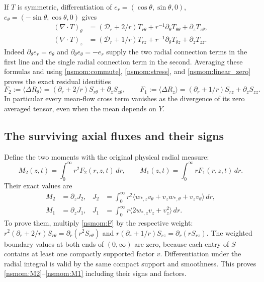If $T$ is symmetric, differentiation of
$e_r=(\cos\theta,\sin\theta,0)$,
$e_\theta=(-\sin\theta,\cos\theta,0)$ gives
\begin{align*}
 (\nabla\cdot T)_\theta
   &=(\mathscr D_r+2/r)T_{r\theta}
       +r^{-1}\partial_\theta T_{\theta\theta}+\partial_zT_{z\theta},\\
 (\nabla\cdot T)_z
   &=(\mathscr D_r+1/r)T_{rz}
       +r^{-1}\partial_\theta T_{\theta z}+\partial_zT_{zz}.
\end{align*}
Indeed $\partial_\theta e_r=e_\theta$ and
$\partial_\theta e_\theta=-e_r$ supply the two radial connection
terms in the first line and the single radial connection term in the
second. Averaging these formulas and using
\eqref{nsmom:commute}, \eqref{nsmom:stress}, and \eqref{nsmom:linear_zero}
proves the exact residual identities
\begin{equation}
 F_2:=\langle\Delta R_\theta\rangle
    =(\partial_r+2/r)S_{r\theta}+\partial_zS_{z\theta},
 \qquad
 F_1:=\langle\Delta R_z\rangle
    =(\partial_r+1/r)S_{rz}+\partial_zS_{zz}.
 \label{nsmom:F}
\end{equation}
In particular every mean-flow cross term vanishes as the divergence
of its zero averaged tensor, even when the mean depends on $Y$.

\subsection{The surviving axial fluxes and their signs}
\label{nsmom:moments}
Define the two moments with the original physical radial measure:
\begin{equation}
 M_2(z,t)=\int_0^\infty r^2F_2(r,z,t)\,dr,
 \qquad M_1(z,t)=\int_0^\infty rF_1(r,z,t)\,dr.
 \label{nsmom:Mdef}
\end{equation}
Their exact values are
\begin{align}
 M_2&=\partial_z J_2, &
 J_2&=\int_0^\infty r^2
    \langle w_{*,z}v_\theta+v_z w_{*,\theta}+v_zv_\theta\rangle\,dr,
 \label{nsmom:M2}\\
 M_1&=\partial_z J_1, &
 J_1&=\int_0^\infty r
    \langle2w_{*,z}v_z+v_z^2\rangle\,dr.
 \label{nsmom:M1}
\end{align}
To prove them, multiply \eqref{nsmom:F} by the respective weight:
$r^2(\partial_r+2/r)S_{r\theta}=\partial_r(r^2S_{r\theta})$
and $r(\partial_r+1/r)S_{rz}=\partial_r(rS_{rz})$.
The weighted boundary values at both ends of $(0,\infty)$ are zero,
because each entry of $S$ contains at least one compactly supported
factor $v$. Differentiation under the radial integral is valid by the
same compact support and smoothness. This proves
\eqref{nsmom:M2}--\eqref{nsmom:M1} including their signs and factors.

